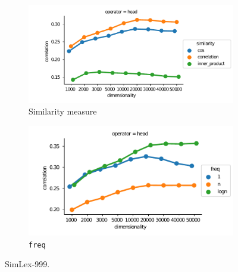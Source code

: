 \begin{figure}
  \centering

  \begin{subfigure}[t]{0.49\textwidth}
    \hspace{-20pt}
  \includegraphics[width=1.1\textwidth]{supplement/figures/SimLex999-interaction-similarity}

  \caption{Similarity measure}
  \label{fig:SimLex999-similarity}

  \end{subfigure}
  \begin{subfigure}[t]{0.49\textwidth}

  \includegraphics[width=\textwidth]{supplement/figures/SimLex999-interaction-freq}

  \caption{\texttt{freq}}
  \label{fig:SimLex999-freq}

  \end{subfigure}

  \caption{SimLex-999.}
\end{figure}
